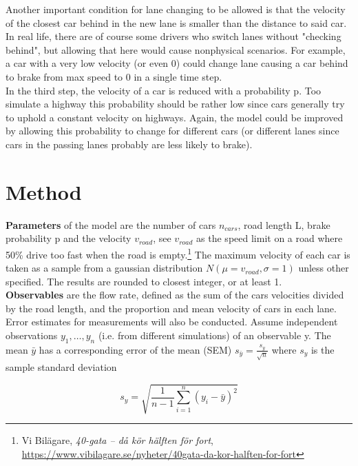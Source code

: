 \documentclass[a4paper,12pt]{article}
\begin{document}
Another important condition for lane changing to be allowed is that the velocity of the closest car behind in the new lane is smaller than the distance to said car. In real life, there are of course some drivers who switch lanes without "checking behind", but allowing that here would cause nonphysical scenarios. For example, a car with a very low velocity (or even 0) could change lane causing a car behind to brake from max speed to 0 in a single time step.\\

In the third step, the velocity of a car is reduced with a probability p. Too simulate a highway this probability should be rather low since cars generally try to uphold a constant velocity on highways. Again, the model could be improved by allowing this probability to change for different cars (or different lanes since cars in the passing lanes probably are less likely to brake).\newpage


\section{Method}
\textbf{Parameters} of the model are the number of cars $n_{cars}$, road length L, brake probability p and the velocity $v_{road}$, see $v_{road}$ as the speed limit on a road where 50\% drive too fast when the road is empty.\footnote{Vi Bilägare, \textit{40-gata – då kör hälften för fort},  \url{https://www.vibilagare.se/nyheter/40gata-da-kor-halften-for-fort}} The maximum velocity of each car is taken as a sample from a gaussian distribution $N(\mu = v_{road}, \sigma=1)$ unless other specified. The results are rounded to closest integer, or at least 1.\\

\textbf{Observables} are the flow rate, defined as the sum of the cars velocities divided by the road length, and the proportion and mean velocity of cars in each lane.\\

Error estimates for measurements will also be conducted. Assume independent observations $y_1, \dots, y_n$ (i.e. from different simulations) of an observable y. The mean $\bar{y}$ has a corresponding error of the mean (SEM) $s_{\bar{y}} = \frac{s_y}{\sqrt{n}}$ where $s_y$ is the sample standard deviation 

\begin{equation}
	s_y=\sqrt{\frac{1}{n-1} \sum_{i=1}^{n}(y_i-\bar{y})^2}
\end{equation}
\end{document}

